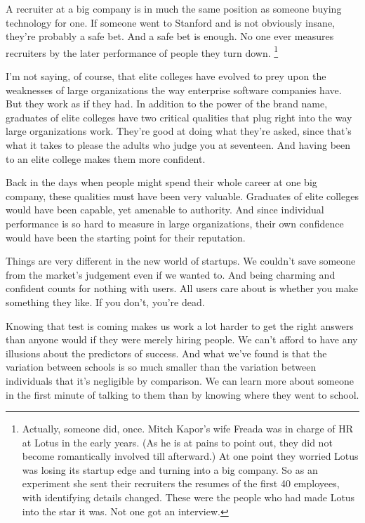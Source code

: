 A recruiter at a big company is in much the same position as someone
buying technology for one. If someone went to Stanford and is not
obviously insane, they're probably a safe bet. And a safe bet is enough.
No one ever measures recruiters by the later performance of people they
turn down. \footnote{Actually, someone did, once. Mitch Kapor's wife Freada was in
charge of HR at Lotus in the early years. (As he is at pains to point
out, they did not become romantically involved till afterward.) At one
point they worried Lotus was losing its startup edge and turning into a
big company. So as an experiment she sent their recruiters the resumes
of the first 40 employees, with identifying details changed. These were
the people who had made Lotus into the star it was. Not one got an
interview.}

I'm not saying, of course, that elite colleges have evolved to prey upon
the weaknesses of large organizations the way enterprise software
companies have. But they work as if they had. In addition to the power
of the brand name, graduates of elite colleges have two critical
qualities that plug right into the way large organizations work. They're
good at doing what they're asked, since that's what it takes to please
the adults who judge you at seventeen. And having been to an elite
college makes them more confident.

Back in the days when people might spend their whole career at one big
company, these qualities must have been very valuable. Graduates of
elite colleges would have been capable, yet amenable to authority. And
since individual performance is so hard to measure in large
organizations, their own confidence would have been the starting point
for their reputation.

Things are very different in the new world of startups. We couldn't save
someone from the market's judgement even if we wanted to. And being
charming and confident counts for nothing with users. All users care
about is whether you make something they like. If you don't, you're
dead.

Knowing that test is coming makes us work a lot harder to get the right
answers than anyone would if they were merely hiring people. We can't
afford to have any illusions about the predictors of success. And what
we've found is that the variation between schools is so much smaller
than the variation between individuals that it's negligible by
comparison. We can learn more about someone in the first minute of
talking to them than by knowing where they went to school.

